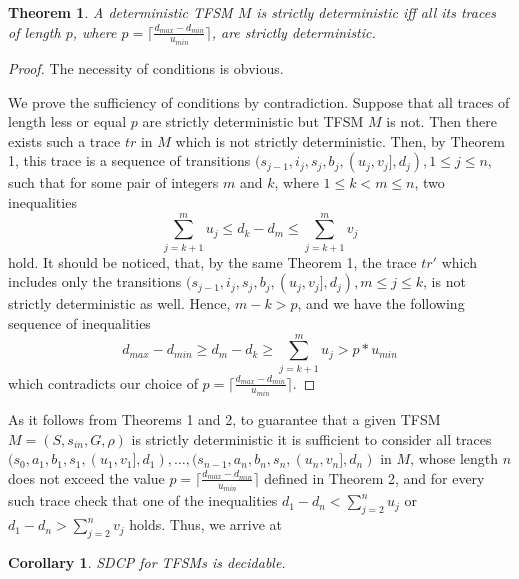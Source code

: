 \documentclass[conference]{IEEEtran}
\newtheorem{theorem}{Theorem}
\newtheorem{corollary}{Corollary}
\begin{document}
\begin{theorem}
{\itshape
A deterministic TFSM $M$ is strictly deterministic iff all its traces of length $p$, where $p = \lceil \frac{d_{max} - d_{min}}{u_{min}} \rceil$, are strictly deterministic.
}
\end{theorem}
\begin{proof}
	The necessity of conditions is obvious.
	
	We prove the sufficiency of conditions by contradiction. Suppose that all traces of length less or equal $p$ are strictly deterministic but TFSM $M$ is not. Then there exists such a trace $tr$ in $M$ which is not strictly deterministic. Then, by Theorem 1, this trace is a sequence of transitions $(s_{j-1}, i_j, s_j, b_j, (u_j, v_j], d_j), 1\leq j\leq n$, such that for some pair of integers $m$ and $k$, where $1 \leq k < m \leq n$, two inequalities 
$$ 
\sum\limits_{j = k + 1}^{m}u_j \leq d_k - d_m \leq \sum\limits_{j = k + 1}^{m} v_j 
$$ 
hold. It should be noticed, that, by the same Theorem 1, the trace $tr'$ which includes only the transitions $(s_{j-1}, i_j, s_j, b_j, (u_j, v_j], d_j), m\leq j\leq k$, is not strictly deterministic as well. Hence, $ m - k > p $, and we have the following sequence of inequalities
$$ 
d_{max} - d_{min} \geq d_m - d_k \geq \sum_{j = k + 1}^{m}u_j > p * u_{min} 
$$
which contradicts our choice of $p = \lceil \frac{d_{max} - d_{min}}{u_{min}} \rceil $.
\end{proof}

As it follows from Theorems 1 and 2, to guarantee that a given TFSM $M = (S, s_{in}, G, \rho )$ is strictly deterministic it is sufficient to consider all traces $(s_0, a_1, b_1, s_1, (u_1, v_1], d_1), \dots,(s_{n-1}, a_n, b_n, s_n, (u_n, v_n], d_n)$ in $M$, whose length $n$ does not exceed the value $p = \lceil \frac{d_{max} - d_{min}}{u_{min}} \rceil$ defined in Theorem 2, and for every such trace check that one of the inequalities $d_1 - d_n < \sum\limits_{j = 2}^{n}u_j$ or $d_1 - d_n > \sum\limits_{j = 2}^{n}v_j$ holds. Thus, we arrive at

\begin{corollary}
{\itshape
SDCP for TFSMs is decidable.
}
\end{corollary}

\end{document}
